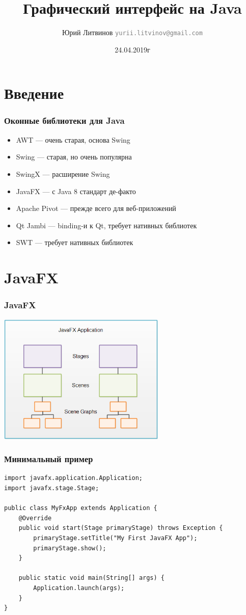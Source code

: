 \documentclass[xetex,mathserif,serif]{beamer}
\title{Графический интерфейс на Java}
\author[Юрий Литвинов]{Юрий Литвинов \newline \textcolor{gray}{\small\texttt{yurii.litvinov@gmail.com}}}
\date{24.04.2019г}
\begin{document}
	
	\frame{\titlepage}
	
	\section{Введение}

	\begin{frame}
		\frametitle{Оконные библиотеки для Java}
		\begin{itemize}
			\item AWT --- очень старая, основа Swing
			\item Swing --- старая, но очень популярна
			\item SwingX --- расширение Swing
			\item JavaFX --- с Java 8 стандарт де-факто
			\item Apache Pivot --- прежде всего для веб-приложений
			\item Qt Jambi --- binding-и к Qt, требует нативных библиотек
			\item SWT --- требует нативных библиотек
		\end{itemize}
	\end{frame}

	\section{JavaFX}

	\begin{frame}
		\frametitle{JavaFX}
		\begin{center}
			\includegraphics[width=0.6\textwidth]{javaFxOverview.png}
		\end{center}
	\end{frame}

	\begin{frame}[fragile]
		\frametitle{Минимальный пример}
		\begin{verbatim}
import javafx.application.Application;
import javafx.stage.Stage;

public class MyFxApp extends Application {
    @Override
    public void start(Stage primaryStage) throws Exception {
        primaryStage.setTitle("My First JavaFX App");
        primaryStage.show();
    }
    
    public static void main(String[] args) {
        Application.launch(args);
    }
}
		\end{verbatim}
	\end{frame}
\end{document}
